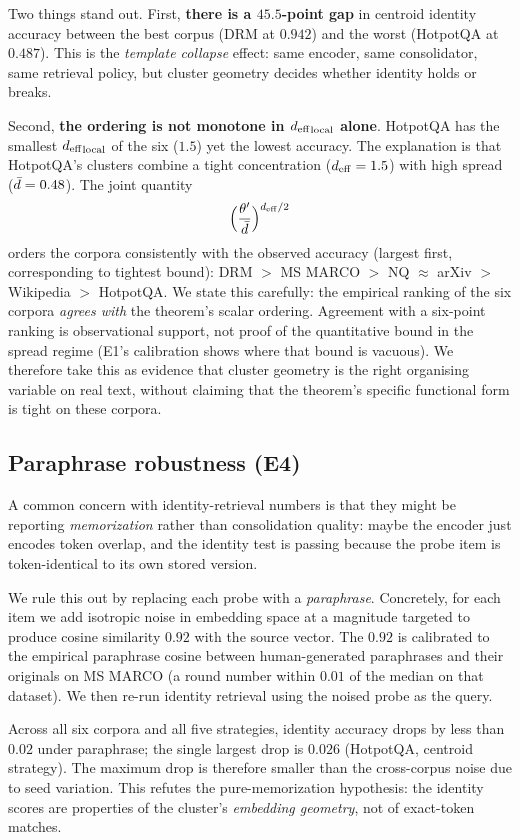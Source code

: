 Two things stand out. First, \textbf{there is a $45.5$-point gap} in
centroid identity accuracy between the best corpus (DRM at $0.942$) and
the worst (HotpotQA at $0.487$). This is the \emph{template collapse}
effect: same encoder, same consolidator, same retrieval policy, but
cluster geometry decides whether identity holds or breaks.

Second, \textbf{the ordering is not monotone in ${d_{\mathrm{eff}}}_{\mathrm{local}}$
alone}. HotpotQA has the smallest ${d_{\mathrm{eff}}}_{\mathrm{local}}$ of the six
($1.5$) yet the lowest accuracy. The explanation is that HotpotQA's
clusters combine a tight concentration (${d_{\mathrm{eff}}} = 1.5$) with high spread
($\bar{d} = 0.48$). The joint quantity
\[
\Bigl(\frac{\theta'}{\bar{d}}\Bigr)^{{d_{\mathrm{eff}}}/2}
\]
orders the corpora consistently with the observed accuracy (largest
first, corresponding to tightest bound): DRM $> $ MS MARCO $>$ NQ
$\approx$ arXiv $>$ Wikipedia $>$ HotpotQA. We state this
carefully: the empirical ranking of the six corpora
\emph{agrees with} the theorem's scalar ordering. Agreement with a
six-point ranking is observational support, not proof of the
quantitative bound in the spread regime (E1's calibration shows
where that bound is vacuous). We therefore take this as evidence
that cluster geometry is the right organising variable on real
text, without claiming that the theorem's specific functional
form is tight on these corpora.

\subsection{Paraphrase robustness (E4)}
\label{sec:template_collapse:paraphrase}

A common concern with identity-retrieval numbers is that they might be
reporting \emph{memorization} rather than consolidation quality: maybe
the encoder just encodes token overlap, and the identity test is
passing because the probe item is token-identical to its own stored
version.

We rule this out by replacing each probe with a \emph{paraphrase}.
Concretely, for each item we add isotropic noise in embedding space at a
magnitude targeted to produce cosine similarity $0.92$ with the source
vector. The $0.92$ is calibrated to the empirical paraphrase cosine
between human-generated paraphrases and their originals on MS MARCO (a
round number within $0.01$ of the median on that dataset). We then
re-run identity retrieval using the noised probe as the query.

Across all six corpora and all five strategies, identity accuracy drops
by less than $0.02$ under paraphrase; the single largest drop is $0.026$
(HotpotQA, centroid strategy). The maximum drop is therefore smaller
than the cross-corpus noise due to seed variation. This refutes the
pure-memorization hypothesis: the identity scores are properties of the
cluster's \emph{embedding geometry}, not of exact-token matches.

